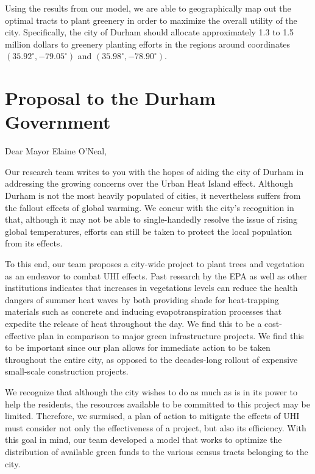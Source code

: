 \documentclass[11pt]{article}
\begin{document}
Using the results from our model, we are able to geographically map out the optimal tracts to plant greenery in order to maximize the overall utility of the city. Specifically, the city of Durham should allocate approximately 1.3 to 1.5 million dollars to greenery planting efforts in the regions around coordinates $(35.92^{\circ}, -79.05^{\circ})$ and $(35.98^{\circ}, -78.90^{\circ})$.

\pagebreak

\section{Proposal to the Durham Government}
\noindent Dear Mayor Elaine O’Neal,

Our research team writes to you with the hopes of aiding the city of Durham in addressing the growing concerns over the Urban Heat Island effect. Although Durham is not the most heavily populated of cities, it nevertheless suffers from the fallout effects of global warming. We concur with the city’s recognition in that, although it may not be able to single-handedly resolve the issue of rising global temperatures, efforts can still be taken to protect the local population from its effects.

To this end, our team proposes a city-wide project to plant trees and vegetation as an endeavor to combat UHI effects. Past research by the EPA as well as other institutions indicates that increases in vegetations levels can reduce the health dangers of summer heat waves by both providing shade for heat-trapping materials such as concrete and inducing evapotranspiration processes that expedite the release of heat throughout the day. We find this to be a cost-effective plan in comparison to major green infrastructure projects. We find this to be important since our plan allows for immediate action to be taken throughout the entire city, as opposed to the decades-long rollout of expensive small-scale construction projects.

We recognize that although the city wishes to do as much as is in its power to help the residents, the resources available to be committed to this project may be limited. Therefore, we surmised, a plan of action to mitigate the effects of UHI must consider not only the effectiveness of a project, but also its efficiency. With this goal in mind, our team developed a model that works to optimize the distribution of available green funds to the various census tracts belonging to the city.
\end{document}
